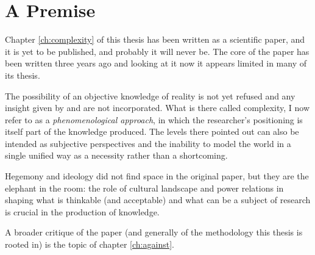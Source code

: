 \chapter{A Premise}
Chapter \ref{ch:complexity} of this thesis has been written as a scientific paper, and it is yet to be published, and probably it will never be.
The core of the paper has been written three years ago and looking at it now it appears limited in many of its thesis.

The possibility of an objective knowledge of reality is not yet refused and any insight given by \textcite{feyerabend1982} and \textcite{lyotard1979} are not incorporated.
What is there called complexity, I now refer to as a \textit{phenomenological approach}, in which the researcher's positioning is itself part of the knowledge produced.
The levels there pointed out can also be intended as subjective perspectives and the inability to model the world in a single unified way as a necessity rather than a shortcoming.

Hegemony and ideology did not find space in the original paper, but they are the elephant in the room: the role of cultural landscape and power relations in shaping what is thinkable (and acceptable) and what can be a subject of research is crucial in the production of knowledge.


A broader critique of the paper (and generally of the methodology this thesis is rooted in) is the topic of chapter \ref{ch:against}.